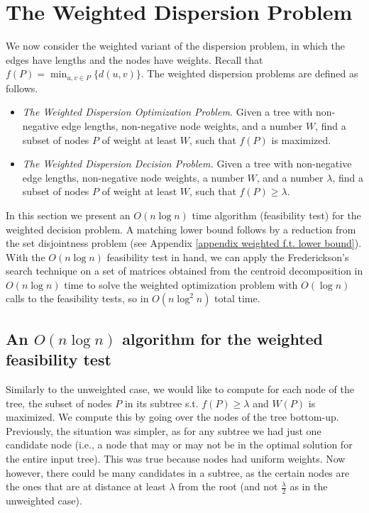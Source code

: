 \documentclass[a4paper,UKenglish]{lipics-v2016}
\theoremstyle{plain}
\begin{document}
\section{The Weighted Dispersion Problem}\label{section:weighted}
We now consider the weighted variant of the dispersion problem, in which the edges have lengths and the nodes have weights. Recall that $f(P)=\min_{u,v\in P} \{d(u,v)\}$. The weighted dispersion problems are defined as follows.
\begin{itemize} 
\item {\em The Weighted Dispersion Optimization Problem.} Given a tree with non-negative edge lengths, non-negative node weights, and a number $W$, find a subset of nodes $P$ of weight at least $W$, such that  $f(P)$ is maximized. 

\item {\em The Weighted Dispersion Decision Problem.} Given a tree with non-negative edge lengths, non-negative node weights, a number $W$, and a number $\lambda$, find a subset of nodes  $P$ of weight at least $W$, such that $f(P)\geq\lambda$. 
\end{itemize}


In this section we present an $O(n\log n)$ time algorithm (feasibility test) for the weighted decision problem. A matching lower bound follows by a reduction from the set disjointness problem (see Appendix \ref{appendix weighted f.t. lower bound}).
With the $O(n\log n)$ feasibility test in hand, we can apply the Frederickson's search technique on a set of
matrices obtained from the centroid decomposition in $O(n\log n)$ time to solve the weighted optimization
problem with $O(\log n)$ calls to the feasibility tests, so in $O(n\log^{2}n)$ total time.



\subsection{An \texorpdfstring{\boldmath$O(n \log n)$}{O(nlogn)} algorithm for the weighted feasibility test}\label{O(nlogn) weighted f.t.}
Similarly to the unweighted case, we would like to compute for each node of the tree, the subset of nodes $P$ in its subtree  s.t. $f(P) \geq \lambda$ and $W(P)$ is maximized. We compute this by going over the nodes of the tree bottom-up. Previously, the situation was simpler, as for any subtree we had just one candidate node (i.e., a node that may or may not be in the optimal solution for the entire input tree). This was true because nodes had uniform weights. Now however, there could be many candidates in a subtree, as the certain nodes are the ones that are at distance at least $\lambda$ from the root (and not $\frac{\lambda}{2}$ as in the unweighted case).
\end{document}
